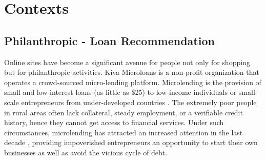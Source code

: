 





\section{Contexts}
    \subsection{Philanthropic - Loan Recommendation}

    Online sites have become a significant avenue for people not only for shopping but for philanthropic activities. Kiva Microloans is a non-profit organization that operates a crowd-sourced micro-lending platform. Microlending is the provision of small and low-interest loans (as little as \$25) to low-income individuals or small-scale entrepreneurs from under-developed countries \cite{yunus1998banker}. The extremely poor people in rural areas often lack collateral, steady employment, or a verifiable credit history, hence they cannot get access to financial services. Under such circumstances, microlending has attracted an increased attention in the last decade \cite{chen2017microfinance}, providing impoverished entrepreneurs an opportunity to start their own businesses as well as avoid the vicious cycle of debt.
    
